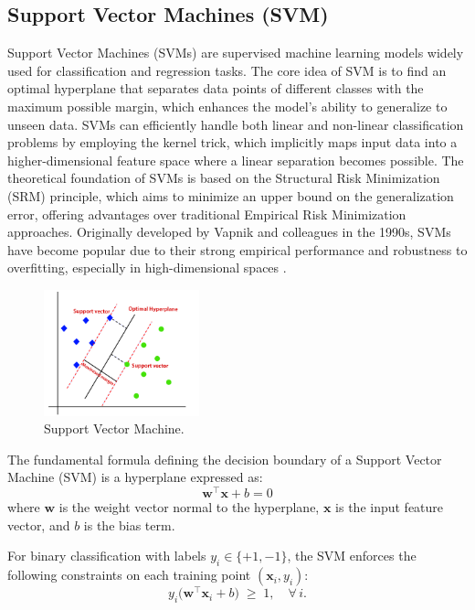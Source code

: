 \subsection{Support Vector Machines (SVM)}
\label{sec:svm}
Support Vector Machines (SVMs) are supervised machine learning models widely used for classification and regression tasks. The core idea of SVM is to find an optimal hyperplane that separates data points of different classes with the maximum possible margin, which enhances the model’s ability to generalize to unseen data. SVMs can efficiently handle both linear and non-linear classification problems by employing the kernel trick, which implicitly maps input data into a higher-dimensional feature space where a linear separation becomes possible. The theoretical foundation of SVMs is based on the Structural Risk Minimization (SRM) principle, which aims to minimize an upper bound on the generalization error, offering advantages over traditional Empirical Risk Minimization approaches. Originally developed by Vapnik and colleagues in the 1990s, SVMs have become popular due to their strong empirical performance and robustness to overfitting, especially in high-dimensional spaces \cite{Gunn1998SupportVM}.
\begin{figure}[H]
  \centering
  \includegraphics[width=0.4\textwidth]{Images/Chapter1/svm.png}
  \caption{Support Vector Machine.}
  \label{fig:svm}
\end{figure}
The fundamental formula defining the decision boundary of a Support Vector Machine (SVM) is a hyperplane expressed as:
\begin{equation}
  \mathbf{w}^\top \mathbf{x} + b = 0
\end{equation}
where $\mathbf{w}$ is the weight vector normal to the hyperplane, $\mathbf{x}$ is the input feature vector, and $b$ is the bias term.

For binary classification with labels $y_i \in \{+1, -1\}$, the SVM enforces the following constraints on each training point $(\mathbf{x}_i, y_i)$:
\begin{equation}
  y_i \bigl(\mathbf{w}^\top \mathbf{x}_i + b\bigr) \;\ge\; 1,
  \quad \forall\,i.
\end{equation}

